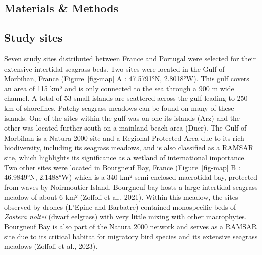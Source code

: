\documentclass[
  letterpaper,
  11pt,
  english,
  singlespacing,
  headsepline]{MastersDoctoralThesis}
\begin{document}
\begin{spacing}{1.5}
\section{Materials \& Methods}\label{materials-methods}

\subsection{Study sites}\label{study-sites}

Seven study sites distributed between France and Portugal were selected
for their extensive intertidal seagrass beds. Two sites were located in
the Gulf of Morbihan, France (Figure~\ref{fig-map} A : 47.5791°N,
2.8018°W). This gulf covers an area of 115 km² and is only connected to
the sea through a 900 m wide channel. A total of 53 small islands are
scattered across the gulf leading to 250 km of shorelines. Patchy
seagrass meadows can be found on many of these islands. One of the sites
within the gulf was on one its islands (Arz) and the other was located
further south on a mainland beach area (Duer). The Gulf of Morbihan is a
Natura 2000 site and a Regional Protected Area due to its rich
biodiversity, including its seagrass meadows, and is also classified as
a RAMSAR site, which highlights its significance as a wetland of
international importance. Two other sites were located in Bourgneuf Bay,
France (Figure~\ref{fig-map} B : 46.9849°N, 2.1488°W) which is a 340 km²
semi-enclosed macrotidal bay, protected from waves by Noirmoutier
Island. Bourgneuf bay hosts a large intertidal seagrass meadow of about
6 km² (Zoffoli et al., 2021). Within this meadow, the sites observed by
drones (L'Epine and Barbatre) contained monospecific beds of
\emph{Zostera noltei} (dwarf eelgrass) with very little mixing with
other macrophytes. Bourgneuf Bay is also part of the Natura 2000 network
and serves as a RAMSAR site due to its critical habitat for migratory
bird species and its extensive seagrass meadows (Zoffoli et al., 2023).

\begin{figure}

\centering{

}
\end{figure}
\end{spacing}
\end{document}
